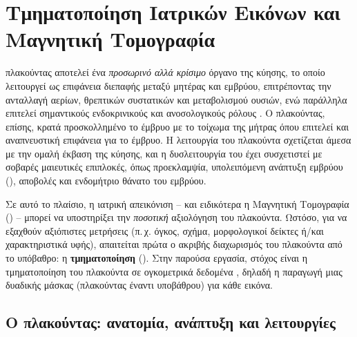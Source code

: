 \chapter{Τμηματοποίηση Ιατρικών Εικόνων και Μαγνητική Τομογραφία}
\label{ch:seg_mri}
 πλακούντας αποτελεί ένα \textit{προσωρινό αλλά κρίσιμο} όργανο της κύησης, το οποίο λειτουργεί ως
επιφάνεια διεπαφής μεταξύ μητέρας και εμβρύου, επιτρέποντας την ανταλλαγή αερίων, θρεπτικών συστατικών και μεταβολισμού ουσιών, ενώ
παράλληλα επιτελεί σημαντικούς ενδοκρινικούς και ανοσολογικούς ρόλους 
\cite{burton2015placenta,maltepe2015forgotten,gude2004growth}. Ο πλακούντας, επίσης, κρατά προσκολλημένο το έμβρυο με το τοίχωμα της μήτρας όπου επιτελεί και αναπνευστική επιφάνεια για το έμβρυο.
Η λειτουργία του πλακούντα σχετίζεται άμεσα με την ομαλή έκβαση της κύησης, και η δυσλειτουργία του έχει
συσχετιστεί με σοβαρές μαιευτικές επιπλοκές, όπως προεκλαμψία, υπολειπόμενη ανάπτυξη εμβρύου (), αποβολές και ενδομήτριο θάνατο του εμβρύου.

Σε αυτό το πλαίσιο, η ιατρική απεικόνιση -- και ειδικότερα η Μαγνητική Τομογραφία () -- μπορεί να υποστηρίξει
την \textit{ποσοτική} αξιολόγηση του πλακούντα. Ωστόσο, για να εξαχθούν αξιόπιστες μετρήσεις (π.\,χ. όγκος, σχήμα,
μορφολογικοί δείκτες ή/και χαρακτηριστι\-κά υφής), απαιτείται πρώτα ο ακριβής διαχωρισμός του πλακούντα από το υπόβα\-θρο:
η \textbf{τμη\-ματοποίηση} (). Στην παρούσα εργασία, στόχος είναι η τμηματοποίηση του πλακούντα σε
ογκομετρικά δεδομένα , δηλαδή η παραγωγή μιας δυαδικής μάσκας (πλακούντας έναντι υποβάθρου) για κάθε εικόνα.

\section{Ο πλακούντας: ανατομία, ανάπτυξη και λειτουργίες}
\label{sec:placenta_phys}

